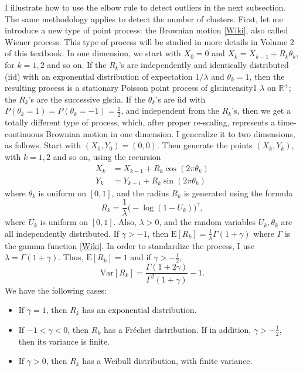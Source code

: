 \documentclass[10pt]{article}
\begin{document}
\noindent I illustrate how to use the elbow rule to detect outliers in the next subsection. The same methodology applies to detect the number of clusters. First, let me introduce a new type of
point process: the 
\textcolor{index}{Brownian motion} [\href{https://en.wikipedia.org/wiki/Brownian_motion}{Wiki}], also called 
\textcolor{index}{Wiener process}. This type of process will be studied in more details in Volume 2 of this textbook.  In one dimension, we start with $X_0=0$ and $X_k=X_{k-1}+R_k\theta_k$, for $k=1,2$ and so on. If the $R_k$'s are independently and identically distributed (iid) with an exponential distribution of expectation $1/\lambda$ and $\theta_k=1$, then the resulting process is a stationary Poisson point process of 
\gls{gls:intensity1} $\lambda$ on $\mathbb{R}^{+}$; the $R_k$'s are the successive 
\gls{gls:ia}. If the $\theta_k$'s are iid with $P(\theta_k=1)=P(\theta_k=-1)=\frac{1}{2}$, and independent from the $R_k$'s, then we get a totally different type of process, which, after proper re-scaling, represents a time-continuous Brownian motion in one dimension. I generalize it to two dimensions, as follows. Start with $(X_0,Y_0)=(0,0)$. Then generate the points $(X_k, Y_k)$, with $k=1,2$ and so on, using the recursion
\begin{align}
X_k &  =  X_{k-1}+R_k \cos(2\pi\theta_k) \label{brown10} \\
Y_k & = Y_{k-1}+ R_k\sin(2\pi\theta_k) \label{brown11}
\end{align}
where $\theta_k$ is uniform on $[0, 1]$, and the radius $R_k$ is generated using the formula
\begin{equation}
R_k=\frac{1}{\lambda}\Big(-\log(1-U_k)\Big)^\gamma, \label{gam11}
\end{equation}
where $U_k$ is uniform on $[0,1]$. Also, $\lambda>0$, and the random variables $U_k,\theta_k$ are all independently distributed. If $\gamma>-1$, then
$\mbox{E}[R_k]=\frac{1}{\lambda}\Gamma(1+\gamma)$ where $\Gamma$ is the \textcolor{index}{gamma function} 
[\href{https://en.wikipedia.org/wiki/Gamma_function}{Wiki}]. In order to standardize the process, I use
$\lambda=\Gamma(1+\gamma)$. Thus, $\mbox{E}[R_k]=1$ and if $\gamma>-\frac{1}{2}$,
$$\mbox{Var}[R_k]=\frac{\Gamma(1+2\gamma)}{\Gamma^2(1+\gamma)}-1.$$
We have the following cases:
\begin{itemize}
\item If $\gamma=1$, then $R_k$ has an exponential distribution.
\item If $-1<\gamma<0$, then $R_k$ has a \textcolor{index}{Fréchet distribution}. If in addition, $\gamma>-\frac{1}{2}$, then its variance is finite. 
\item If $\gamma>0$, then $R_k$ has a \textcolor{index}{Weibull distribution}, with finite variance. 
\end{itemize}
\end{document}
